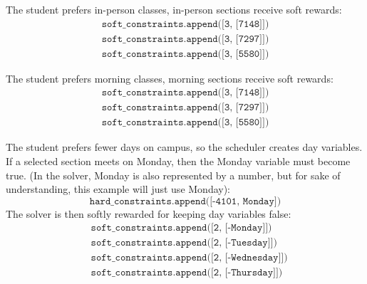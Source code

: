 \documentclass[11pt, a4paper]{article} %
\newcommand{\<}{\langle}
\renewcommand{\>}{\rangle}
\begin{document}
The student prefers in-person classes, in-person sections receive
  soft rewards:
\begin{align*}
    \texttt{soft\_constraints.append([3, [7148]])}\\
    \texttt{soft\_constraints.append([3, [7297]])}\\
    \texttt{soft\_constraints.append([3, [5580]])}
\end{align*}
 
The student prefers morning classes, morning sections receive soft
  rewards:
\begin{align*}
    \texttt{soft\_constraints.append([3, [7148]])}\\
    \texttt{soft\_constraints.append([3, [7297]])}\\
    \texttt{soft\_constraints.append([3, [5580]])}
\end{align*}

The student prefers fewer days on campus, so the scheduler creates day
  variables. If a selected section meets on Monday, then the Monday variable
  must become true. (In the solver, Monday is also represented by a number, but for sake of understanding, this example will just use Monday):
  \[
  \texttt{hard\_constraints.append([-4101, Monday])}
  \]
  The solver is then softly rewarded for keeping day variables false:
\begin{align*}
    &\texttt{soft\_constraints.append([2, [-Monday]])}\\
    &\texttt{soft\_constraints.append([2, [-Tuesday]])}\\
    &\texttt{soft\_constraints.append([2, [-Wednesday]])}\\
    &\texttt{soft\_constraints.append([2, [-Thursday]])}
\end{align*}
\end{document}
